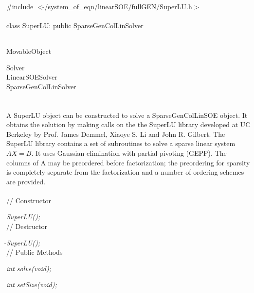 
   \\
\indent \#include $<\tilde{
}$/system\_of\_eqn/linearSOE/fullGEN/SuperLU.h$>$  \\ 

  \\
class SuperLU: public SparseGenColLinSolver  


 \\
 MovableObject 

\indent\indent  Solver \\
\indent\indent\indent LinearSOESolver \\
\indent\indent\indent\indent  SparseGenColLinSolver \\
\indent\indent\indent\indent{} \\

  \\
\indent A SuperLU object can be constructed to solve
a SparseGenColLinSOE object. It obtains the solution by making calls on the
the SuperLU library developed at UC Berkeley by Prof. James Demmel, 
Xiaoye S. Li and John R. Gilbert.
The SuperLU library contains a set of subroutines to solve a sparse
linear system  $AX=B$. It uses Gaussian elimination with partial
pivoting (GEPP). The columns of A may be preordered before
factorization; the preordering for sparsity is completely separate
from the factorization and a number of ordering schemes are provided. \\

  \\
// Constructor 

{\em SuperLU();}  \\ 

// Destructor 

{\em $\tilde{ }$SuperLU();}\\  

// Public Methods 

{\em int solve(void);} 

{\em int setSize(void);} 

\\ 
\\ 

